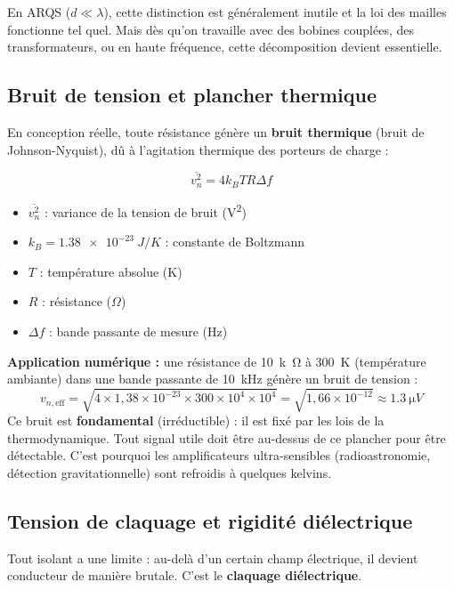 \documentclass[12pt,a4paper,twoside]{book}
\begin{document}
En ARQS ($d \ll \lambda$), cette distinction est généralement inutile et la loi des mailles fonctionne tel quel. Mais dès qu'on travaille avec des bobines couplées, des transformateurs, ou en haute fréquence, cette décomposition devient essentielle.

\subsection{Bruit de tension et plancher thermique}

En conception réelle, toute résistance génère un \textbf{bruit thermique} (bruit de Johnson-Nyquist), dû à l'agitation thermique des porteurs de charge :

\begin{formule}
\[
\boxed{\overline{v_n^2} = 4 k_B T R \Delta f}
\]
\begin{itemize}[nosep]
\item $\overline{v_n^2}$ : variance de la tension de bruit (\si{V^2})
\item $k_B = \SI{1.38e-23}{J/K}$ : constante de Boltzmann
\item $T$ : température absolue (K)
\item $R$ : résistance ($\Omega$)
\item $\Delta f$ : bande passante de mesure (Hz)
\end{itemize}
\end{formule}

\begin{pratique}
\textbf{Application numérique :} une résistance de \SI{10}{k\ohm} à \SI{300}{K} (température ambiante) dans une bande passante de \SI{10}{kHz} génère un bruit de tension :
\[
v_{n,\text{eff}} = \sqrt{4 \times 1{,}38\times10^{-23} \times 300 \times 10^4 \times 10^4} = \sqrt{1{,}66\times10^{-12}} \approx \SI{1.3}{\micro V}
\]
Ce bruit est \textbf{fondamental} (irréductible) : il est fixé par les lois de la thermodynamique. Tout signal utile doit être au-dessus de ce plancher pour être détectable. C'est pourquoi les amplificateurs ultra-sensibles (radioastronomie, détection gravitationnelle) sont refroidis à quelques kelvins.
\end{pratique}

\subsection{Tension de claquage et rigidité diélectrique}

Tout isolant a une limite : au-delà d'un certain champ électrique, il devient conducteur de manière brutale. C'est le \textbf{claquage diélectrique}.
\end{document}
